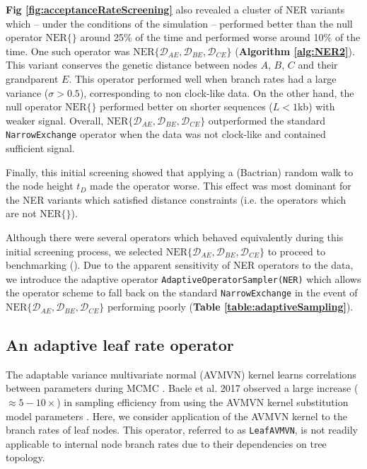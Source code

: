 \documentclass[10pt,letterpaper]{article}
\begin{document}
\textbf{Fig \ref{fig:acceptanceRateScreening}} also revealed a cluster of NER variants which -- under the conditions of the simulation --  performed better than the null operator $\text{NER}\{\}$ around 25\% of the time and performed worse around 10\% of the time. 
One such operator was  $\text{NER}\{\mathcal{D}_{AE}, \mathcal{D}_{BE}, \mathcal{D}_{CE}\}$  (\textbf{Algorithm \ref{alg:NER2}}). 
This variant conserves the genetic distance between nodes $A$, $B$, $C$ and their grandparent $E$. 
This operator performed well when branch rates had a large variance ($\sigma > 0.5$), corresponding to non clock-like data. 
On the other hand, the null operator $\text{NER}\{\}$ performed better on shorter sequences ($L < 1$kb) with weaker signal.  
Overall, $\text{NER}\{\mathcal{D}_{AE}, \mathcal{D}_{BE}, \mathcal{D}_{CE}\}$ outperformed the standard \texttt{NarrowExchange} operator when the data was not clock-like and contained sufficient signal. 



Finally, this initial screening showed that applying a (Bactrian) random walk to the node height $t_D$ made the operator worse.
This effect was most dominant for the NER variants which satisfied distance constraints (i.e. the operators which are not $\text{NER}\{\}$).




Although there were several operators which behaved equivalently during this initial screening process, we selected $\text{NER}\{\mathcal{D}_{AE}, \mathcal{D}_{BE}, \mathcal{D}_{CE}\}$ to proceed to benchmarking (\textbf{}).
Due to the apparent sensitivity of NER operators to the data, we introduce the adaptive operator \texttt{AdaptiveOperatorSampler(NER)} which allows the operator scheme to fall back on the standard \texttt{NarrowExchange} in the event of $\text{NER}\{\mathcal{D}_{AE}, \mathcal{D}_{BE}, \mathcal{D}_{CE}\}$ performing poorly (\textbf{Table \ref{table:adaptiveSampling}}).









\subsection*{An adaptive leaf rate operator}
\label{AVMVN_sect}

The adaptable variance multivariate normal (AVMVN) kernel  learns correlations between parameters during MCMC \cite{baele2017adaptive,suchard2018bayesian}. 
Baele et al. 2017  observed a large increase ($\approx 5-10 \times$) in sampling efficiency from using the AVMVN kernel substitution model parameters \cite{baele2017adaptive}.  
Here, we consider application of the AVMVN kernel to the branch rates of leaf nodes. 
This operator, referred to as \texttt{LeafAVMVN}, is not readily applicable to internal node branch rates due to their dependencies on tree topology.  
\end{document}
